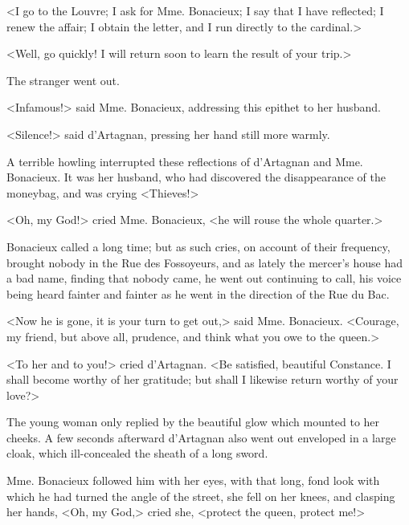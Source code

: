 <I go to the Louvre; I ask for Mme. Bonacieux; I say that I have reflected; I renew the affair; I obtain the letter, and I run directly to the cardinal.> 

<Well, go quickly! I will return soon to learn the result of your trip.> 

The stranger went out. 

<Infamous!> said Mme. Bonacieux, addressing this epithet to her husband. 

<Silence!> said d'Artagnan, pressing her hand still more warmly. 

A terrible howling interrupted these reflections of d'Artagnan and Mme. Bonacieux. It was her husband, who had discovered the disappearance of the moneybag, and was crying <Thieves!> 

<Oh, my God!> cried Mme. Bonacieux, <he will rouse the whole quarter.> 

Bonacieux called a long time; but as such cries, on account of their frequency, brought nobody in the Rue des Fossoyeurs, and as lately the mercer's house had a bad name, finding that nobody came, he went out continuing to call, his voice being heard fainter and fainter as he went in the direction of the Rue du Bac. 

<Now he is gone, it is your turn to get out,> said Mme. Bonacieux. <Courage, my friend, but above all, prudence, and think what you owe to the queen.> 

<To her and to you!> cried d'Artagnan. <Be satisfied, beautiful Constance. I shall become worthy of her gratitude; but shall I likewise return worthy of your love?> 

The young woman only replied by the beautiful glow which mounted to her cheeks. A few seconds afterward d'Artagnan also went out enveloped in a large cloak, which ill-concealed the sheath of a long sword. 

Mme. Bonacieux followed him with her eyes, with that long, fond look with which he had turned the angle of the street, she fell on her knees, and clasping her hands, <Oh, my God,> cried she, <protect the queen, protect me!> 

